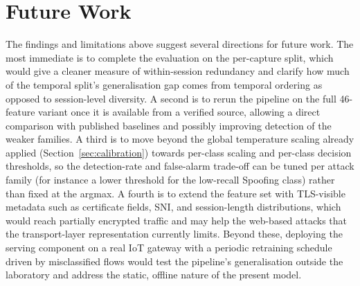\section{Future Work}
\label{sec:future_work}

\par The findings and limitations above suggest several directions for future work. The most immediate is to complete the evaluation on the per-capture split, which would give a cleaner measure of within-session redundancy and clarify how much of the temporal split's generalisation gap comes from temporal ordering as opposed to session-level diversity. A second is to rerun the pipeline on the full 46-feature variant once it is available from a verified source, allowing a direct comparison with published baselines and possibly improving detection of the weaker families. A third is to move beyond the global temperature scaling already applied (Section~\ref{sec:calibration}) towards per-class scaling and per-class decision thresholds, so the detection-rate and false-alarm trade-off can be tuned per attack family (for instance a lower threshold for the low-recall Spoofing class) rather than fixed at the argmax. A fourth is to extend the feature set with TLS-visible metadata such as certificate fields, SNI, and session-length distributions, which would reach partially encrypted traffic and may help the web-based attacks that the transport-layer representation currently limits. Beyond these, deploying the serving component on a real IoT gateway with a periodic retraining schedule driven by misclassified flows would test the pipeline's generalisation outside the laboratory and address the static, offline nature of the present model.
